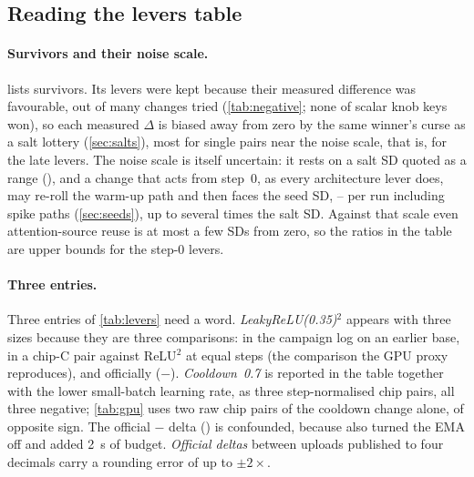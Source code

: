 \begin{table}[!htbp]
  \centering
  \caption{\textbf{Step-count changes between uploads rehearsed on the same chip} (rehearsals, cold except
    's, \texttt{results/official-scores.csv}). Each row bundles every change between the two uploads.}
  \label{tab:steps}
  
\end{table}

\subsection{Reading the levers table}
\label{sec:lever-notes}

\paragraph{Survivors and their noise scale.}  lists survivors. Its levers were kept because their
measured difference was favourable, out of many changes tried (\cref{tab:negative}; none of
\docnum{} scalar knob keys won), so each measured $\Delta$ is biased away from zero by the same
winner's curse as a salt lottery (\cref{sec:salts}), most for single pairs near the noise scale, that is, for the
late levers. The noise scale is itself uncertain: it rests on a salt SD quoted as a range (\docnum{}),
and a change that acts from step~0, as every architecture lever does, may re-roll the warm-up path and then faces the
seed SD, -- per run including spike paths (\cref{sec:seeds}), up to several
times the salt SD. Against that scale even attention-source reuse is at most a few SDs from zero, so the ratios in
the table are upper bounds for the step-0 levers.

\paragraph{Three entries.}

Three entries of \cref{tab:levers} need a word. \emph{LeakyReLU(0.35)$^2$} appears with three sizes because they are
three comparisons: \docnum{} in the campaign log on an earlier base, \docnum{} in a
chip-C pair against ReLU$^2$ at equal steps (the comparison the GPU proxy reproduces), and 
officially ($-$). \emph{Cooldown~0.7} is reported in the table together with the lower small-batch learning
rate, as three step-normalised chip pairs\docnum{}, all three negative; \cref{tab:gpu} uses two raw chip pairs of the
cooldown change alone, of opposite sign. The official $-$ delta () is
confounded, because  also turned the EMA off and added 2~s of budget. \emph{Official deltas} between uploads
published to four decimals carry a rounding error of up to $\pm2\times$.

